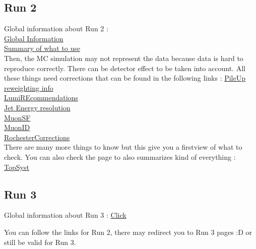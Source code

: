 \documentclass[reprint, a4paper, nofootinbib, amsmath, amssymb, aps]{revtex4-1}
\begin{document}
\subsection{Run 2}
    Global information about Run 2 : \\
    \href{https://twiki.cern.ch/twiki/bin/view/CMS/PdmVRun2LegacyAnalysis}{Global Information} \\
    \href{https://twiki.cern.ch/twiki/bin/viewauth/CMS/PdmVAnalysisSummaryTable}{Summary of what to use} \\
    Then, the MC simulation may not represent the data because data is hard to reproduce correctly. There can be detector effect to be taken into account. All these things need corrections that can be found in the following links : 
    \href{https://twiki.cern.ch/twiki/bin/view/CMS/PileupJetIDUL#Recommendations_for_2018_UL_data}{PileUp reweighting info} \\
    \href{https://twiki.cern.ch/twiki/bin/view/CMS/LumiRecommendationsRun2}{LumiREcommendations} \\
    \href{https://twiki.cern.ch/twiki/bin/view/CMSPublic/WorkBookJetEnergyResolution}{Jet Energy resolution} \\
    \href{https://indico.cern.ch/event/1247210/sessions/478562/attachments/2587866/4465075/MuonPOG_tutorial_part2.pdf}{MuonSF} \\
    \href{https://twiki.cern.ch/twiki/bin/viewauth/CMS/SWGuideMuonIdRun2}{MuonID} \\
    \href{https://twiki.cern.ch/twiki/bin/view/CMS/RochcorMuon}{RochesterCorrections}\\
    There are many more things to know but this give you a firstview of what to check. You can also check the page to also summarizes kind of everything : \href{https://twiki.cern.ch/twiki/bin/view/CMS/TopSystematics}{TopSyst} 
    
\subsection{Run 3}
    Global information about Run 3 : \href{https://twiki.cern.ch/twiki/bin/view/CMS/PdmVRun3Analysis#Run_3_Analysis}{Click}

    You can follow the links for Run 2, there may redirect you to Run 3 pages :D or still be valid for Run 3.
\end{document}
